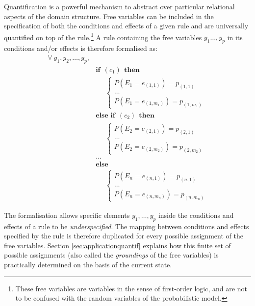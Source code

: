 Quantification is a powerful mechanism to abstract over particular relational aspects of the domain structure.  Free variables can be included in the specification of both the conditions and effects of a given rule and are universally quantified on top of the rule.\footnote{These free variables are variables in the sense of first-order logic, and are not to be confused with the random variables of the probabilistic model.}  A rule containing the free variables $y_1 \dots, y_p$ in its conditions and/or effects is therefore formalised as:
\begin{equation}
\begin{aligned}
\forall \ y_1, y_2, \dots, y_p, \\
& \textbf{if} \ \ (c_{1}) \ \ \textbf{then} \\ 
& \;\;\;\;\; \begin{cases}
P(E_1\!=\!e_{(1,1)}) = p_{(1,1)} \\
 \dots \\
P(E_1\!=\!e_{(1,m_1)}) = p_{(1,m_1)} 
\end{cases} \\[3mm]
& \textbf{else if} \ \ (c_{2}) \ \ \textbf{then} \\ 
& \;\;\;\;\; \begin{cases}
P(E_2\!=\!e_{(2,1)}) = p_{(2,1)} \\
 \dots \\
P(E_2\!=\!e_{(2,m_2)}) = p_{(2,m_2)} 
\end{cases} \\ 
&  \dots  \\
& \textbf{else} \\
& \;\;\;\;\; \begin{cases}
P(E_n\!=\!e_{(n,1)}) = p_{(n,1)} \\
 \dots \\
P(E_n\!=\!e_{(n,m_n)}) = p_{(n,m_n)}
\end{cases}
\end{aligned}
\label{eq:rulewithquant}
\end{equation}

The formalisation allows specific elements $y_1, \dots, y_p$ inside the conditions and effects of a rule to be \textit{underspecified}.  The mapping between conditions and effects specified by the rule is therefore duplicated for every possible assignment of the free variables.  Section \ref{sec:applicationquantif} explains how this finite set of possible assignments (also called the \textit{groundings} of the free variables) is practically determined on the basis of the current state. 


